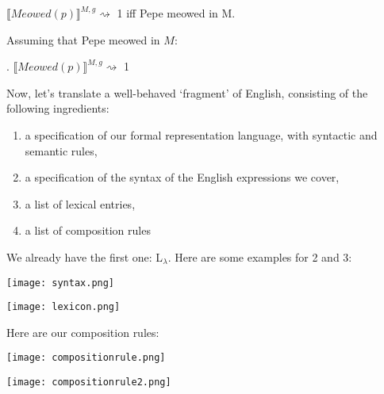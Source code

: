 \documentclass[11pt]{article}
\begin{document}
$\llbracket Meowed(p)\rrbracket^{M,g} \rightsquigarrow$  1 iff Pepe meowed in M. 



Assuming that Pepe meowed in $M$: 

\ex. $\llbracket Meowed(p)\rrbracket^{M,g} \rightsquigarrow$  1 

\newpage
Now, let's translate a well-behaved `fragment' of English, consisting of the following ingredients: 

\begin{enumerate}
\item a specification of our formal representation language, with syntactic and semantic rules, 
\item a specification of the syntax of the English expressions we cover, 
\item a list of lexical entries,
\item a list of composition rules
\end{enumerate}


\vspace{10pt}

We already have the first one: L$_\lambda$. Here are some examples for 2 and 3: 



\begin{multicols}{2}
\texttt{[image: syntax.png]}

\texttt{[image: lexicon.png]}
\end{multicols}


Here are our composition rules: 






\begin{center}
\texttt{[image: compositionrule.png]}
\end{center}

\begin{center}
\texttt{[image: compositionrule2.png]}
\end{center}

\newpage
\end{document}

